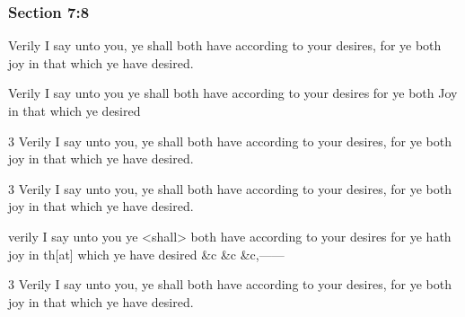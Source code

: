 	\subsubsection{Section 7:8} %
		\label{DC7-8}

		Verily I say unto you, ye shall both have according to your desires, for ye both joy in that which ye have desired.

		\begin{framed}
		\scriptsize
			\begin{compactdesc}
				\item[JSP] Verily I say unto you ye shall both have according to your desires for ye both Joy in that which ye desired
				\item[BC] 3 Verily I say unto you, ye shall both have according to your desires, for ye both joy in that which ye have desired.
				\item[DC 1835] 3 Verily I say unto you, ye shall both have according to your desires, for ye both joy in that which ye have desired.
				\item[FGW] verily I say unto you ye <shall> both have according to your desires for ye hath joy in th[at] which ye have desired \&c \&c \&c,------
				\item[DC 1844] 3 Verily I say unto you, ye shall both have according to your desires, for ye both joy in that which ye have desired.
			\end{compactdesc}
		\end{framed}